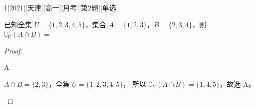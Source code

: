 \documentclass[
showanswers,             %
answercolor=red,      %
numbercolor=purple      %
]{biscuits}
\begin{document}
\begin{example}{1}[2021][天津][高一][月考][第2题][单选]
	
已知全集 $U=\{1,2,3,4,5\}$，集合 $A=\{1,2,3\}$，$B=\{2,3,4\}$，则 $\complement_U(A\cap B)=$\blankbox
	\begin{choices}
	\end{choices}
	\begin{proof}
		
		\begin{answer}
			A
		\end{answer}
		\begin{solutions}
			$A\cap B = \{2,3\}$，全集 $U=\{1,2,3,4,5\}$，
			所以 $\complement_U(A\cap B) = \{1,4,5\}$，故选 A。
		\end{solutions}
	\end{proof}
\end{example}
\end{document}
